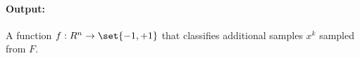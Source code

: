 

\paragraph{Output:}
A function $f: R^n \to \set{-1,+1}$ that classifies additional samples ${x^k}$ sampled from $F$.

